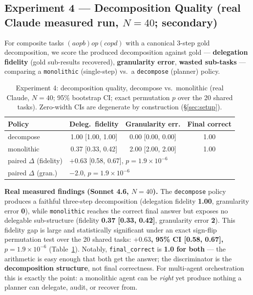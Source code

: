 \documentclass[sigconf,nonacm,anonymous]{acmart}  %
\begin{document}
\subsection{Experiment 4 --- Decomposition Quality (real Claude measured run,
$N{=}40$; secondary)}
For composite tasks $(a \mathbin{op} b) \mathbin{op} (c \mathbin{op} d)$ with a
canonical 3-step gold decomposition, we score the produced decomposition against
gold --- \textbf{delegation fidelity} (gold sub-results recovered),
\textbf{granularity error}, \textbf{wasted sub-tasks} --- comparing a
\texttt{monolithic} (single-step) vs.\ a \texttt{decompose} (planner) policy.

\begin{table}[t]
\centering
\caption{Experiment 4: decomposition quality, decompose vs.\ monolithic (real
Claude, $N{=}40$; 95\% bootstrap CI; exact permutation $p$ over the 20 shared
tasks). Zero-width CIs are degenerate by construction (\S\ref{sec:setup}).}
\label{tab:exp4}
\small
\setlength{\tabcolsep}{4pt}
\begin{tabular}{@{}lccc@{}}
\toprule
\textbf{Policy} & \textbf{Deleg.\ fidelity} & \textbf{Granularity err.} &
\textbf{Final correct} \\
\midrule
decompose & 1.00 [1.00, 1.00] & 0.00 [0.00, 0.00] & 1.00 \\
monolithic & 0.37 [0.33, 0.42] & 2.00 [2.00, 2.00] & 1.00 \\
\midrule
paired $\Delta$ (fidelity) & \multicolumn{3}{l}{$+0.63$ [0.58, 0.67], $p{=}1.9{\times}10^{-6}$} \\
paired $\Delta$ (gran.) & \multicolumn{3}{l}{$-2.0$, $p{=}1.9{\times}10^{-6}$} \\
\bottomrule
\end{tabular}
\end{table}

\textbf{Real measured findings (Sonnet 4.6, $N{=}40$).} The \texttt{decompose}
policy produces a faithful three-step decomposition (delegation fidelity
\textbf{1.00}, granularity error \textbf{0}), while \texttt{monolithic} reaches
the correct final answer but exposes no delegable sub-structure (fidelity
\textbf{0.37 [0.33, 0.42]}, granularity error \textbf{2}). This fidelity gap is
large and statistically significant under an exact sign-flip permutation test
over the 20 shared tasks: \textbf{$+0.63$, 95\% CI [0.58, 0.67], $p{=}1.9{\times}10^{-6}$}
(Table~\ref{tab:exp4}). Notably, \texttt{final\_correct} is \textbf{1.0 for both}
--- the arithmetic is easy enough that both get the answer; the discriminator is
the \textbf{decomposition structure}, not final correctness. For multi-agent
orchestration this is exactly the point: a monolithic agent can be \emph{right}
yet produce nothing a planner can delegate, audit, or recover from.
\end{document}
